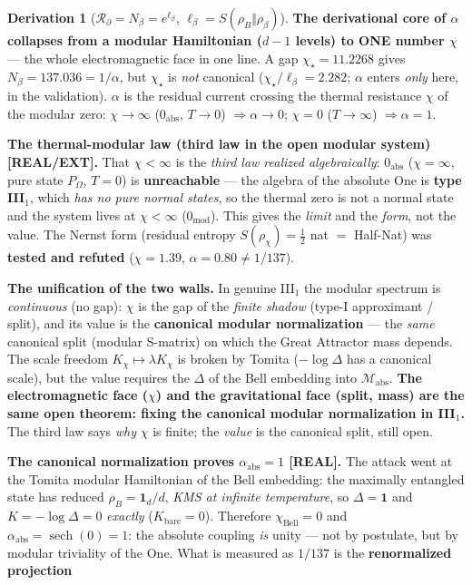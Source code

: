 \documentclass[11pt]{article}
\theoremstyle{definition}\newtheorem{deriv}{Derivation}
\begin{document}
\begin{deriv}[$\mathcal{R}_\partial=N_\beta=e^{\ell_\beta}$, $\ell_\beta=S(\rho_B\Vert\rho_\beta)$]
\textbf{The derivational core of $\alpha$ collapses from a modular Hamiltonian ($d-1$ levels) to ONE number $\chi$} --- the whole electromagnetic face in one line. A gap $\chi_\star=11.2268$ gives $N_\beta=137.036=1/\alpha$, but $\chi_\star$ is \emph{not} canonical ($\chi_\star/\ell_\beta=2.282$; $\alpha$ enters \emph{only} here, in the validation). $\alpha$ is the residual current crossing the thermal resistance $\chi$ of the modular zero: $\chi\to\infty$ ($0_{\mathrm{abs}}$, $T\to0$) $\Rightarrow\alpha\to0$; $\chi=0$ ($T\to\infty$) $\Rightarrow\alpha=1$.

\textbf{The thermal-modular law (third law in the open modular system) \textsf{[REAL/EXT]}.} That $\chi<\infty$ is the \emph{third law realized algebraically}: $0_{\mathrm{abs}}$ ($\chi=\infty$, pure state $P_\Omega$, $T=0$) is \textbf{unreachable} --- the algebra of the absolute One is \textbf{type III$_1$}, which \emph{has no pure normal states}, so the thermal zero is not a normal state and the system lives at $\chi<\infty$ ($0_{\mathrm{mod}}$). This gives the \emph{limit} and the \emph{form}, not the value. The Nernst form (residual entropy $S(\rho_\chi)=\tfrac12$ nat $=$ Half-Nat) was \textbf{tested and refuted} ($\chi=1.39$, $\alpha=0.80\neq1/137$).

\textbf{The unification of the two walls.} In genuine III$_1$ the modular spectrum is \emph{continuous} (no gap): $\chi$ is the gap of the \emph{finite shadow} (type-I approximant / split), and its value is the \textbf{canonical modular normalization} --- the \emph{same} canonical split (modular S-matrix) on which the Great Attractor mass depends. The scale freedom $K_\chi\mapsto\lambda K_\chi$ is broken by Tomita ($-\log\Delta$ has a canonical scale), but the value requires the $\Delta$ of the Bell embedding into $\mathcal{M}_{\mathrm{abs}}$. \textbf{The electromagnetic face ($\chi$) and the gravitational face (split, mass) are the same open theorem: fixing the canonical modular normalization in III$_1$.} The third law says \emph{why} $\chi$ is finite; the \emph{value} is the canonical split, still open.

\textbf{The canonical normalization proves $\alpha_{\mathrm{abs}}=1$ \textsf{[REAL]}.} The attack went at the Tomita modular Hamiltonian of the Bell embedding: the maximally entangled state has reduced $\rho_B=\mathbf 1_d/d$, \emph{KMS at infinite temperature}, so $\Delta=\mathbf 1$ and $K=-\log\Delta=0$ \emph{exactly} ($K_{\mathrm{bare}}=0$). Therefore $\chi_{\mathrm{Bell}}=0$ and $\boxed{\alpha_{\mathrm{abs}}=\operatorname{sech}(0)=1}$: the absolute coupling \emph{is} unity --- not by postulate, but by modular triviality of the One. What is measured as $1/137$ is the \textbf{renormalized projection}


\end{deriv}
\end{document}
